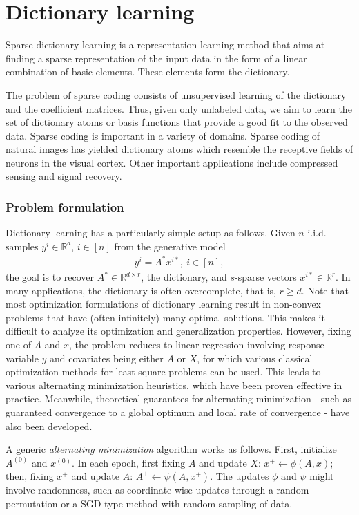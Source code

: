 
\section{Dictionary learning}

Sparse dictionary learning is a representation learning method that aims at finding a sparse representation of the input data in the form of a linear combination of basic elements. These elements form the dictionary. 

The problem of sparse coding consists of unsupervised learning of the dictionary and the coefficient matrices. Thus, given only unlabeled data, we aim to learn the set of dictionary atoms or
basis functions that provide a good fit to the observed data. Sparse coding is important in a variety of domains. Sparse coding of natural images has yielded dictionary atoms which resemble the receptive fields of neurons in the visual cortex. Other important applications include compressed sensing and signal recovery.

\subsubsection{Problem formulation}

Dictionary learning has a particularly simple setup as follows. Given $n$ i.i.d. samples $y^i\in \mathbb{R}^d$, $i\in [n]$ from the generative model
\begin{align}
    y^i = A^* x^{i*}, \ i\in [n], \label{eq:gen-model}
\end{align}
the goal is to recover $A^*\in \mathbb{R}^{d\times r}$, the dictionary, and $s$-sparse vectors $x^{i*}\in \mathbb{R}^r$.  In many applications, the dictionary is often overcomplete, that is, $r \geq d$. Note that most optimization formulations of dictionary learning result in non-convex problems that have (often infinitely) many optimal solutions. This makes it difficult to analyze its optimization and generalization properties. 
However, fixing one of $A$ and $x$, the problem reduces to linear regression involving response variable $y$ and covariates being either $A$ or $X$, for which various classical optimization methods for least-square problems can be used. This leads to various alternating minimization heuristics, which have been proven effective in practice. Meanwhile, theoretical guarantees for alternating minimization - such as guaranteed convergence to a global optimum and local rate of convergence - have also been developed.


A generic \textit{alternating minimization} algorithm works as follows. First, initialize $A^{(0)}$ and $x^{(0)}$. In each epoch, first fixing $A$ and update $X$: $x^+ \leftarrow \phi(A, x)$; then, fixing $x^+$ and update $A$: $A^+ \leftarrow \psi(A, x^+)$. The updates $\phi$ and $\psi$ might involve randomness, such as coordinate-wise updates through a random permutation or a SGD-type method with random sampling of data. 


